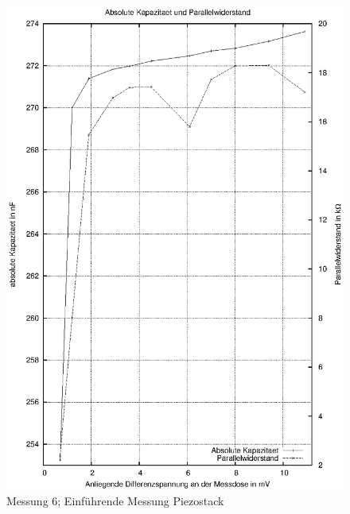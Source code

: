 \documentclass[12pt]{scrreprt} %
\begin{document}
\begin {figure}[htbp]
      \begin{center}
        \includegraphics{tabelle2_2_1}
      \end{center}
\caption{Messung 6; Einführende Messung Piezostack}
\label{fig:2.6}
\end{figure}

\newpage
\end{document}
